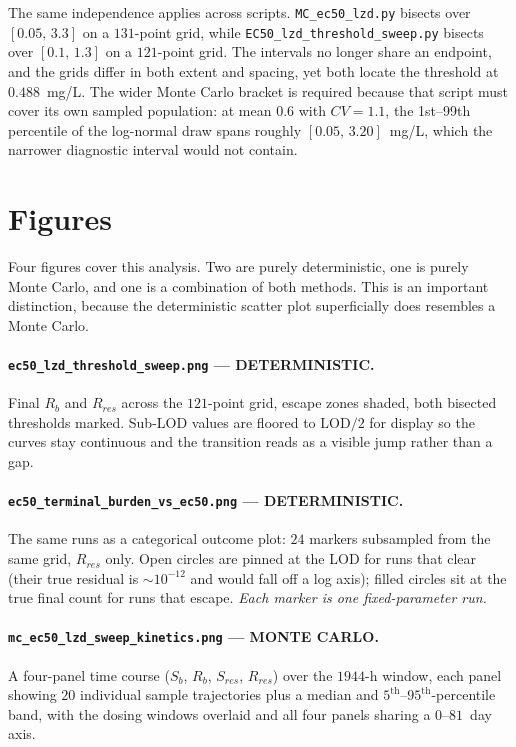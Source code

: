 \documentclass[11pt]{article}
\begin{document}
The same independence applies across scripts. \texttt{MC\_ec50\_lzd.py}
bisects over $[0.05,\,3.3]$ on a $131$-point grid, while
\texttt{EC50\_lzd\_threshold\_sweep.py} bisects over $[0.1,\,1.3]$ on a
$121$-point grid. The intervals no longer share an endpoint, and the grids
differ in both extent and spacing, yet both locate the threshold at
$0.488$~mg/L. The wider Monte Carlo bracket is required because that script
must cover its own sampled population: at mean $0.6$ with $CV = 1.1$, the
1st--99th percentile of the log-normal draw spans roughly
$[0.05,\,3.20]$~mg/L, which the narrower diagnostic interval would not
contain.


\section{Figures}
\label{sec:outputs}

Four figures cover this analysis. Two are purely deterministic, one is
purely Monte Carlo, and one is a combination of both methods.  This is an important distinction, because the deterministic scatter plot superficially does resembles a Monte Carlo.

\paragraph{\texttt{ec50\_lzd\_threshold\_sweep.png} --- DETERMINISTIC.}
Final $R_b$ and $R_{res}$ across the $121$-point grid, escape zones shaded,
both bisected thresholds marked. Sub-LOD values are floored to
$\mathrm{LOD}/2$ for display so the curves stay continuous and the
transition reads as a visible jump rather than a gap.

\paragraph{\texttt{ec50\_terminal\_burden\_vs\_ec50.png} --- DETERMINISTIC.}
The same runs as a categorical outcome plot: $24$ markers subsampled from
the same grid, $R_{res}$ only. Open circles are pinned at the LOD for runs
that clear (their true residual is $\sim$$10^{-12}$ and would fall off a
log axis); filled circles sit at the true final count for runs that escape.
\emph{Each marker is one fixed-parameter run.}

\paragraph{\texttt{mc\_ec50\_lzd\_sweep\_kinetics.png} --- MONTE CARLO.}
A four-panel time course ($S_b$, $R_b$, $S_{res}$, $R_{res}$) over the
$1944$-h window, each panel showing $20$ individual sample trajectories
plus a median and $5^{\mathrm{th}}$--$95^{\mathrm{th}}$-percentile band,
with the dosing windows overlaid and all four panels sharing a
$0$--$81$~day axis.
\end{document}
